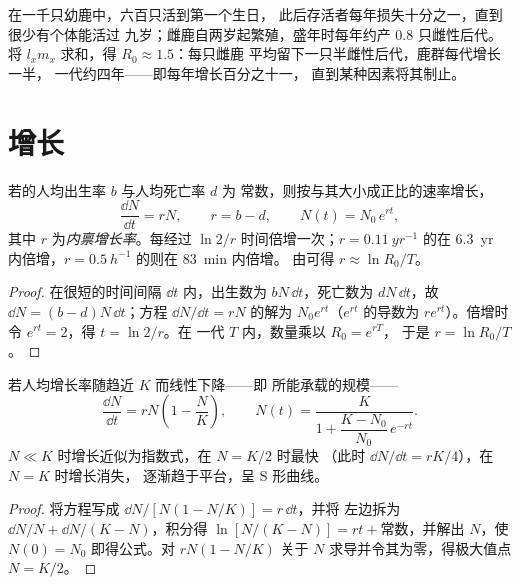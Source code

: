 \begin{example}[一个鹿群的生命表]\label{ex:b1:populations:deer}
在一千只幼鹿中，六百只活到第一个生日，
此后存活者每年损失十分之一，直到很少有个体能活过
九岁；雌鹿自两岁起繁殖，盛年时每年约产 0.8 只雌性后代。
将 $l_x m_x$ 求和，得 $R_0 \approx 1.5$：每只雌鹿
平均留下一只半雌性后代，鹿群每代增长一半，
一代约四年——即每年增长百分之十一，
直到某种因素将其制止。
\end{example}

\section{增长}

\begin{theorem}[指数增长]\label{thm:b1:populations:exponential}
若的人均出生率 $b$ 与人均死亡率 $d$ 为
常数，则按与其大小成正比的速率增长，
\[
\frac{\dd N}{\dd t} = rN, \qquad r = b - d, \qquad N(t) = N_0\,e^{rt},
\]
其中 $r$ 为\emph{内禀增长率}。每经过
$\ln 2/r$ 时间倍增一次；$r = \qty{0.11}{yr^{-1}}$ 的在
\qty{6.3}{yr} 内倍增，$r = \qty{0.5}{h^{-1}}$ 的则在 \qty{83}{min} 内倍增。
由可得 $r \approx \ln R_0 / T$。
\end{theorem}
\begin{proof}
在很短的时间间隔 $\dd t$ 内，出生数为 $bN\,\dd t$，死亡数为
$dN\,\dd t$，故 $\dd N = (b - d)N\,\dd t$；方程
$\dd N/\dd t = rN$ 的解为 $N_0 e^{rt}$（$e^{rt}$ 的导数为
$re^{rt}$）。倍增时令 $e^{rt} = 2$，得 $t = \ln 2/r$。在
一代 $T$ 内，数量乘以 $R_0 = e^{rT}$，
于是 $r = \ln R_0/T$。
\end{proof}

\begin{theorem}[逻辑斯谛增长]\label{thm:b1:populations:logistic}
若人均增长率随趋近
\emph{} $K$ 而线性下降——即
所能承载的规模——
\[
\frac{\dd N}{\dd t} = rN\left(1 - \frac{N}{K}\right), \qquad
N(t) = \frac{K}{1 + \dfrac{K - N_0}{N_0}\,e^{-rt}} .
\]
$N \ll K$ 时增长近似为指数式，在 $N = K/2$ 时最快
（此时 $\dd N/\dd t = rK/4$），在 $N = K$ 时增长消失，
逐渐趋于平台，呈 S 形曲线。
\end{theorem}
\begin{proof}
将方程写成 $\dd N/[N(1 - N/K)] = r\,\dd t$，并将
左边拆为 $\dd N/N + \dd N/(K - N)$，积分得
$\ln[N/(K - N)] = rt + \text{常数}$，并解出 $N$，使 $N(0) =
N_0$ 即得公式。对 $rN(1 - N/K)$ 关于
$N$ 求导并令其为零，得极大值点 $N = K/2$。
\end{proof}

